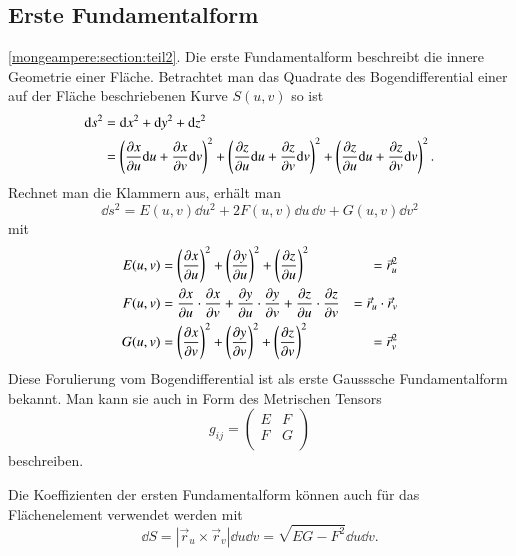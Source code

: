 \subsection{Erste Fundamentalform
\label{mongeampere:subsection:finibus}}
\ref{mongeampere:section:teil2}.
Die erste Fundamentalform beschreibt die innere Geometrie einer Fläche.
Betrachtet man das Quadrate des Bogendifferential einer auf der Fläche 
beschriebenen Kurve $S(u,v)$ so ist 
\begin{equation}
  \begin{split}
    \dd s^2 &= \dd x^2 + \dd y^2 + \dd z^2 \\
          &= \left(\pdv{x}{u}\dd u + \pdv{x}{v}\dd v  \right)^2
          + \left(\pdv{z}{u}\dd u + \pdv{z}{v}\dd v  \right)^2
          + \left(\pdv{z}{u}\dd u + \pdv{z}{v}\dd v  \right)^2.
  \end{split}
  \label{mongeampere:bogdiff}
\end{equation}
Rechnet man die Klammern aus, erhält man 
\begin{equation}
    \dd s^2 = E(u,v) \dd u^2 + 2F(u,v) \dd u \, \dd v + G(u,v)\dd v^2
    \label{mongeampere:1fundform}
\end{equation}
mit
\begin{align}
     E(u,v) &= \left(\pdv{x}{u} \right)^2 +
     \left(\pdv{y}{u} \right)^2 +
     \left(\pdv{z}{u} \right)^2 
            &= \vec r_u^2\\
     F(u,v) &= 
     \pdv{x}{u} \cdot \pdv{x}{v} +
     \pdv{y}{u} \cdot \pdv{y}{v} +
     \pdv{z}{u} \cdot \pdv{z}{v}
            &= \vec r_u \cdot \vec r_v \\
      G(u,v) &= \left(\pdv{x}{v} \right)^2 +
     \left(\pdv{y}{v} \right)^2 +
     \left(\pdv{z}{v} \right)^2 
             &= \vec r_v ^2\\
  \label{mongeampere:1fundbed}
\end{align}
Diese Forulierung vom Bogendifferential ist als erste Gausssche Fundamentalform bekannt.
Man kann sie auch in Form des Metrischen Tensors 
\begin{equation}
  g_{ij} = \begin{pmatrix}
    E & F \\
    F & G \\
  \end{pmatrix}
  \label{mongeampere:erstmettens}
\end{equation}
beschreiben.

Die Koeffizienten der ersten Fundamentalform können auch für das Flächenelement verwendet werden mit
\begin{equation}
  \dd S = |\vec r_u \times \vec r_v|\dd u \dd v = \sqrt{EG-F^2} \dd u \dd v.
  \label{mongeampere:ds}
\end{equation}


